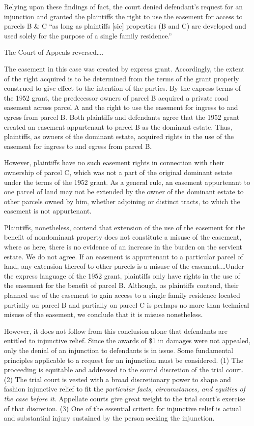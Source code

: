 Relying upon these findings of fact, the court denied defendant's request for an
injunction and granted the plaintiffs the right to use the easement for access
to parcels B \& C ``as long as plaintiffs [sic] properties (B and C) are
developed and used solely for the purpose of a single family residence.''

The Court of Appeals reversed\ldots.

The easement in this case was created by express grant. Accordingly, the extent
of the right acquired is to be determined from the terms of the grant properly
construed to give effect to the intention of the parties.  By the express terms
of the 1952 grant, the predecessor owners of parcel B acquired a private road
easement across parcel A and the right to use the easement for ingress to and
egress from parcel B. Both plaintiffs and defendants agree that the 1952 grant
created an easement appurtenant to parcel B as the dominant estate. Thus,
plaintiffs, as owners of the dominant estate, acquired rights in the use of the
easement for ingress to and egress from parcel B.

However, plaintiffs have no such easement rights in connection with their
ownership of parcel C, which was not a part of the original dominant estate
under the terms of the 1952 grant. As a general rule, an easement appurtenant to
one parcel of land may not be extended by the owner of the dominant estate to
other parcels owned by him, whether adjoining or distinct tracts, to which the
easement is not appurtenant. 

Plaintiffs, nonetheless, contend that extension of the use of the easement for
the benefit of nondominant property does not constitute a misuse of the
easement, where as here, there is no evidence of an increase in the burden on
the servient estate. We do not agree. If an easement is appurtenant to a
particular parcel of land, any extension thereof to other parcels is a misuse of
the easement.\ldots Under the express language of the 1952 grant, plaintiffs
only have rights in the use of the easement for the benefit of parcel B.
Although, as plaintiffs contend, their planned use of the easement to gain
access to a single family residence located partially on parcel B and partially
on parcel C is perhaps no more than technical misuse of the easement, we
conclude that it is misuse nonetheless.

However, it does not follow from this conclusion alone that defendants are
entitled to injunctive relief. Since the awards of \$1 in damages were not
appealed, only the denial of an injunction to defendants is in issue. Some
fundamental principles applicable to a request for an injunction must be
considered. (1) The proceeding is equitable and addressed to the sound
discretion of the trial court. (2) The trial court is vested with a broad
discretionary power to shape and fashion injunctive relief to fit the
\textit{particular facts, circumstances, and equities of the case before it.}
Appellate courts give great weight to the trial court's exercise of that
discretion. (3) One of the essential criteria for injunctive relief is actual
and substantial injury sustained by the person seeking the injunction.  

